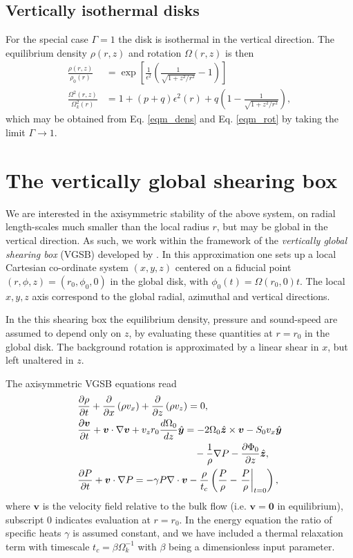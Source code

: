 \subsection{Vertically isothermal disks}
For the special case $\Gamma=1$ the disk is isothermal in the
vertical direction. The equilibrium density $\rho(r,z)$ and rotation
$\Omega(r,z)$ is then 
\begin{align}
  \frac{\rho(r,z)}{\rho_0(r)} &=
  \exp{\left[\frac{1}{\epsilon^2}\left(\frac{1}{\sqrt{1+z^2/r^2}}-1\right)\right]}\\    
  \frac{\Omega^2(r,z)}{\Omega_k^2(r)}& =1+ (p+q)\epsilon^2(r) + q\left(1 -
    \frac{1}{\sqrt{1+z^2/r^2}}\right),\label{vertiso_eqm}
\end{align}
which may be obtained from Eq. \ref{eqm_dens} and Eq. \ref{eqm_rot} by
taking the limit $\Gamma\to 1$. 

\section{The vertically global shearing box} 
We are interested in the axisymmetric stability of the above system,
on radial length-scales much smaller than the local radius $r$, but
may be global in the vertical direction. As such, we work within the
framework of the \emph{vertically global shearing 
  box} (VGSB) developed by \cite{mcnally14}. In this approximation
one sets up a local Cartesian co-ordinate  system $(x,y,z)$ centered
on a fiducial point $(r,\phi,z)=(r_0,\phi_0,0)$ in the global disk, with $\phi_0(t) =
\Omega(r_0,0)t$. The local $x,y,z$ axis correspond to the
global radial, azimuthal and vertical directions.  

In the this shearing box the equilibrium density, pressure and
sound-speed are assumed to depend only on $z$, by evaluating these
quantities at $r=r_0$ in the global disk. The background rotation is
approximated by a linear shear in $x$, but left unaltered in $z$.     

The axisymmetric VGSB equations read 
\begin{align}
  & \frac{\p\rho}{\p t} + \frac{\p}{\p x}\left(\rho v_x\right) +
  \frac{\p}{\p z}\left(\rho v_z\right)=0,\\
  & \frac{\p\bm{v}}{\p t} + \bm{v}\cdot\nabla\bm{v} +
  v_zr_0\frac{d\Omega_0}{dz} \hat{\bm{y}} = - 
  2\Omega_0\hat{\bm{z}}\times\bm{v} - S_0v_x\hat{\bm{y}} \notag\\ 
  &\phantom{\frac{\p\bm{v}}{\p t} + \bm{v}\cdot\nabla\bm{v} +
    v_zr_0\frac{d\Omega_0}{dz} \hat{\bm{y}}=}-\frac{1}{\rho}\nabla P - \frac{\p\Phi_0}{\p z}\hat{\bm{z}},\\
  & \frac{\p P}{\p t} + \bm{v}\cdot\nabla P = -\gamma P
  \nabla\cdot\bm{v} -
  \frac{\rho}{t_c}\left(\frac{P}{\rho}-\left.\frac{P}{\rho}\right|_{t=0}\right), \label{energy_eq}
\end{align}
where $\bm{v}$ is the velocity field relative to the bulk flow
(i.e. $\bm{v}=\bm{0}$ in equilibrium),  
subscript $0$ indicates evaluation at $r=r_0$. In the energy equation
the ratio of specific heats $\gamma$ is assumed constant, 
and we have included a thermal relaxation term with timescale
$t_c=\beta\Omega_k^{-1}$ with $\beta$  being a dimensionless input
parameter.    

